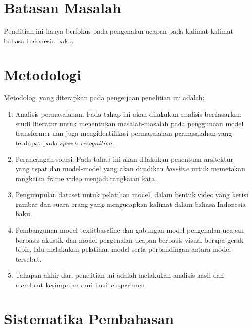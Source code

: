 \section{Batasan Masalah}

Penelitian ini hanya berfokus pada pengenalan ucapan pada kalimat-kalimat bahasa Indonesia baku.


\section{Metodologi}

Metodologi yang diterapkan pada pengerjaan penelitian ini adalah:
\begin{enumerate}
    \item Analisis permasalahan. Pada tahap ini akan dilakukan analisis berdasarkan studi literatur untuk menentukan masalah-masalah pada penggunaan model transformer dan juga mengidentifikasi permasalahan-permasalahan yang terdapat pada \textit{speech recognition}.
    \item Perancangan solusi. Pada tahap ini akan dilakukan penentuan arsitektur yang tepat dan model-model yang akan dijadikan \textit{baseline} untuk memetakan rangkaian frame video menjadi rangkaian kata.
    \item Pengumpulan dataset untuk pelatihan model, dalam bentuk video yang berisi gambar dan suara orang yang mengucapkan kalimat dalam bahasa Indonesia baku.
    \item Pembangunan model textit{baseline} dan gabungan model pengenalan ucapan berbasis akustik dan model pengenalan ucapan berbasis visual berupa gerak bibir, lalu melakukan pelatihan model serta perbandingan antara model tersebut.
    \item Tahapan akhir dari penelitian ini adalah melakukan analisis hasil dan membuat kesimpulan dari hasil eksperimen.
\end{enumerate} 


\section{Sistematika Pembahasan}

